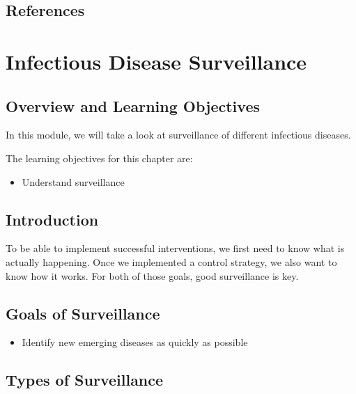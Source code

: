 \documentclass[
]{book}
\providecommand{\tightlist}{%
  \setlength{\itemsep}{0pt}\setlength{\parskip}{0pt}}
\begin{document}
\hypertarget{references-9}{%
\section{References}\label{references-9}}

\hypertarget{infectious-disease-surveillance}{%
\chapter{Infectious Disease Surveillance}\label{infectious-disease-surveillance}}

\hypertarget{overview-and-learning-objectives-9}{%
\section{Overview and Learning Objectives}\label{overview-and-learning-objectives-9}}

In this module, we will take a look at surveillance of different infectious diseases.

The learning objectives for this chapter are:

\begin{itemize}
\tightlist
\item
  Understand surveillance
\end{itemize}

\hypertarget{introduction-9}{%
\section{Introduction}\label{introduction-9}}

To be able to implement successful interventions, we first need to know what is actually happening. Once we implemented a control strategy, we also want to know how it works. For both of those goals, good surveillance is key.

\hypertarget{goals-of-surveillance}{%
\section{Goals of Surveillance}\label{goals-of-surveillance}}

\begin{itemize}
\tightlist
\item
  Identify new emerging diseases as quickly as possible
\end{itemize}

\hypertarget{types-of-surveillance}{%
\section{Types of Surveillance}\label{types-of-surveillance}}
\end{document}
